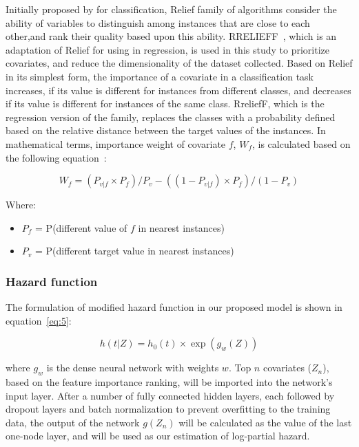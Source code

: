Initially proposed by \cite{kononenko1997overcoming} for classification, Relief family of algorithms consider the ability of variables to distinguish among instances that are close to each other,and rank their quality based upon this ability. RRELIEFF~\citep{robnik1997adaptation}, which is an adaptation of Relief for using in regression, is used in this study to prioritize covariates, and reduce the dimensionality of the dataset collected. Based on Relief in its simplest form, the importance of a covariate in a classification task increases, if its value is different for instances from different classes, and decreases if its value is different for instances of the same class. RreliefF, which is the regression version of the family, replaces the classes with a probability defined based on the relative distance between the target values of the instances. In mathematical terms, importance weight of covariate $f$, $W_f$, is calculated based on the following equation~\citep{robnik2003theoretical}:
\begin{linenomath}
\begin{equation}
\label{relief}
    W_f = ({P_{v|f}\times P_f})/{P_v}  - ({(1-P_{v|f})\times P_f})/({1-P_v})
\end{equation}
\end{linenomath}
Where:
\begin{itemize}
    \item $P_f$ = P(different value of $f$ in nearest instances)
    \item $P_v$ = P(different target value in nearest instances)
\end{itemize}
\subsubsection{Hazard function}
The formulation of modified hazard function in our proposed model is shown in equation~\ref{eq:5}:
\begin{linenomath}
\begin{equation}
\label{eq:5}
    h(t|Z)=h_0(t) \times \exp({g_w(Z)})
\end{equation}
\end{linenomath}
where $g_w$ is the dense neural network with weights $w$. Top $n$ covariates ($Z_n$), based on the feature importance ranking, will be imported into the network's input layer.  After a number of fully connected hidden layers, each followed by dropout layers and batch normalization to prevent overfitting to the training data, the output of the network $g(Z_n)$ will be calculated as the value of the last one-node layer, and will be used as our estimation of log-partial hazard. 

